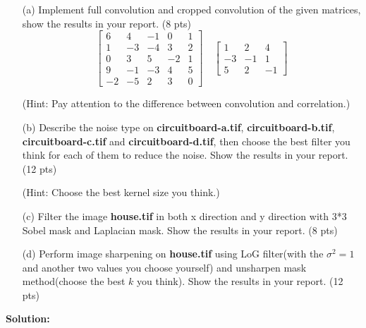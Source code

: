 \documentclass[11pt,letterpaper]{article}
\begin{document}
\begin{itemize}
    \item[(a)] Implement full convolution and cropped convolution of the given matrices, show the results in your report. (8 pts)\\

$$
 \begin{bmatrix}
6 & 4 & -1 & 0 & 1\\ 
1 & -3 & -4 & 3 & 2\\ 
0 & 3 & 5 & -2 & 1\\ 
9 & -1 & -3 & 4 & 5\\ 
-2 & -5 & 2 & 3 & 0
\end{bmatrix}\quad
\begin{bmatrix}
1 & 2 & 4\\ 
-3 & -1 & 1\\ 
5 & 2 & -1
\end{bmatrix}
$$

(\textcolor[rgb]{1,0,0}{Hint:} Pay attention to the difference between convolution and correlation.)

    \item[(b)] Describe the noise type on \textbf{circuitboard-a.tif}, \textbf{circuitboard-b.tif}, \textbf{circuitboard-c.tif} and \textbf{circuitboard-d.tif}, then choose the best filter you think for each of them to reduce the noise. Show the results in your report. (12 pts)

    (\textcolor[rgb]{1,0,0}{Hint:} Choose the best kernel size you think.)

    \item[(c)] Filter the image \textbf{house.tif} in both x direction and y direction with 3*3 Sobel mask and Laplacian mask. Show the results in your report. (8 pts)

    \item[(d)] Perform image sharpening on \textbf{house.tif} using LoG filter(with the $\sigma^2 = 1$ and another two values you choose yourself) and unsharpen mask method(choose the best $k$ you think). Show the results in your report. (12 pts)
\end{itemize}

\textbf{Solution:}
\end{document}
